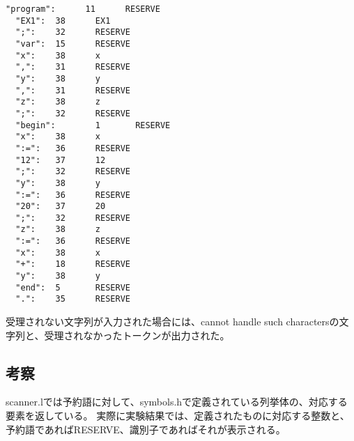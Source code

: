 \begin{lstlisting}[caption={./scanner ex1.pの実行結果},label={./scanner ex1.pの実行結果}]
  "program":      11      RESERVE
  "EX1":  38      EX1
  ";":    32      RESERVE
  "var":  15      RESERVE
  "x":    38      x
  ",":    31      RESERVE
  "y":    38      y
  ",":    31      RESERVE
  "z":    38      z
  ";":    32      RESERVE
  "begin":        1       RESERVE
  "x":    38      x
  ":=":   36      RESERVE
  "12":   37      12
  ";":    32      RESERVE
  "y":    38      y
  ":=":   36      RESERVE
  "20":   37      20
  ";":    32      RESERVE
  "z":    38      z
  ":=":   36      RESERVE
  "x":    38      x
  "+":    18      RESERVE
  "y":    38      y
  "end":  5       RESERVE
  ".":    35      RESERVE
\end{lstlisting}

受理されない文字列が入力された場合には、cannot handle such charactersの文字列と、受理されなかったトークンが出力された。

\subsection{考察}
scanner.lでは予約語に対して、symbols.hで定義されている列挙体の、対応する要素を返している。
実際に実験結果では、定義されたものに対応する整数と、予約語であればRESERVE、識別子であればそれが表示される。
